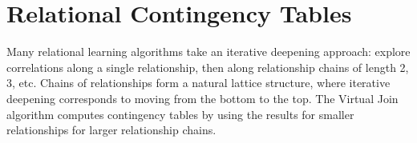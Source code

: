 \documentclass{acm_proc_article-sp}
\begin{document}
\section{Relational  Contingency Tables}
Many relational learning algorithms take an iterative deepening approach: 
explore correlations along a single relationship, then along relationship chains of length 2, 3, etc. 
Chains of relationships form a natural lattice structure, where iterative deepening corresponds to moving from the bottom to the top. 
%
The Virtual Join algorithm computes contingency tables by using the results for smaller relationships for larger relationship chains. 
%
%
\end{document}
